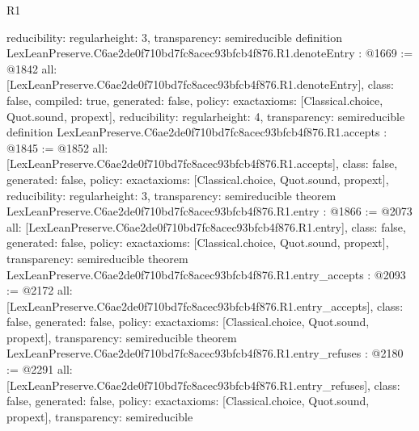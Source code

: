 \begin{lexlean}{R1}
\begin{coremodule}
{  reducibility: regular{height: 3},
  transparency: semireducible
}
definition LexLeanPreserve.C6ae2de0f710bd7fc8acec93bfcb4f876.R1.denoteEntry : @1669 := @1842 {
  all: [LexLeanPreserve.C6ae2de0f710bd7fc8acec93bfcb4f876.R1.denoteEntry],
  class: false,
  compiled: true,
  generated: false,
  policy: exact{axioms: [Classical.choice, Quot.sound, propext]},
  reducibility: regular{height: 4},
  transparency: semireducible
}
definition LexLeanPreserve.C6ae2de0f710bd7fc8acec93bfcb4f876.R1.accepts : @1845 := @1852 {
  all: [LexLeanPreserve.C6ae2de0f710bd7fc8acec93bfcb4f876.R1.accepts],
  class: false,
  generated: false,
  policy: exact{axioms: [Classical.choice, Quot.sound, propext]},
  reducibility: regular{height: 3},
  transparency: semireducible
}
theorem LexLeanPreserve.C6ae2de0f710bd7fc8acec93bfcb4f876.R1.entry : @1866 := @2073 {
  all: [LexLeanPreserve.C6ae2de0f710bd7fc8acec93bfcb4f876.R1.entry],
  class: false,
  generated: false,
  policy: exact{axioms: [Classical.choice, Quot.sound, propext]},
  transparency: semireducible
}
theorem LexLeanPreserve.C6ae2de0f710bd7fc8acec93bfcb4f876.R1.entry_accepts : @2093 := @2172 {
  all: [LexLeanPreserve.C6ae2de0f710bd7fc8acec93bfcb4f876.R1.entry_accepts],
  class: false,
  generated: false,
  policy: exact{axioms: [Classical.choice, Quot.sound, propext]},
  transparency: semireducible
}
theorem LexLeanPreserve.C6ae2de0f710bd7fc8acec93bfcb4f876.R1.entry_refuses : @2180 := @2291 {
  all: [LexLeanPreserve.C6ae2de0f710bd7fc8acec93bfcb4f876.R1.entry_refuses],
  class: false,
  generated: false,
  policy: exact{axioms: [Classical.choice, Quot.sound, propext]},
  transparency: semireducible
}


\end{coremodule}
\end{lexlean}

